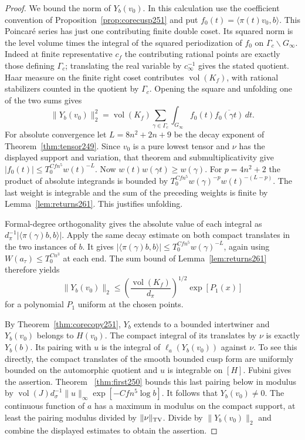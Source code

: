 \documentclass[a4paper,11pt]{article}
\theoremstyle{definition}
\theoremstyle{remark}
\numberwithin{equation}{section}
\begin{document}
\begin{proof}
We bound the norm of \(Y_b(v_0)\). In this calculation use
the coefficient convention of Proposition~\ref{prop:corecusp251}
and put \(f_0(t)=\langle\pi(t)v_0,b\rangle\). This Poincar\'e
series has just one contributing finite double coset. Its squared
norm is the level volume times the integral of the squared
periodization of \(f_0\) on \(\Gamma_c\backslash G_\infty\).
Indeed at finite representative \(c_f\) the contributing
rational points are exactly those defining \(\Gamma_c\);
translating the real variable by \(c_\infty^{-1}\) gives the
stated quotient. Haar measure on the finite right coset
contributes \(\operatorname{vol}(K_f)\), with rational
stabilizers counted in the quotient by \(\Gamma_c\).
Opening the square and unfolding one of the two sums gives
\[
 \|Y_b(v_0)\|_2^2=\operatorname{vol}(K_f)
   \sum_{\gamma\in\Gamma_c}\int_{G_\infty}
                f_0(t)\overline{f_0(\gamma t)}\,dt .
\]
For absolute convergence let \(L=8n^2+2n+9\) be the decay
exponent of Theorem~\ref{thm:tensor249}. Since \(v_0\) is a
pure lowest tensor and \(\nu\) has the displayed support and
variation, that theorem and submultiplicativity give
\(|f_0(t)|\le T_0^{C f n^5}w(t)^{-L}\).
Now \(w(t)w(\gamma t)\ge w(\gamma)\). For \(p=4n^2+2\) the
product of absolute integrands is bounded by
\(T_0^{C f n^5}w(\gamma)^{-p}w(t)^{-(L-p)}\).
The last weight is integrable and the sum of the preceding
weights is finite by Lemma~\ref{lem:returns261}. This
justifies unfolding.

Formal-degree orthogonality gives the absolute value of each
integral as \(d_\pi^{-1}|\langle\pi(\gamma)b,b\rangle|\).
Apply the same decay estimate on both compact translates in
the two instances of \(b\). It gives
\(|\langle\pi(\gamma)b,b\rangle|\le T_0^{C f n^5}w(\gamma)^{-L}\),
again using \(W(a_\tau)\le T_0^{C n^3}\) at each end. The sum
bound of Lemma~\ref{lem:returns261} therefore yields
\[
 \|Y_b(v_0)\|_2\le
 \left(\frac{\operatorname{vol}(K_f)}{d_\pi}\right)^{1/2}
                     \exp[P_1(x)]
\]
for a polynomial \(P_1\) uniform at the chosen points.

By Theorem~\ref{thm:corecopy251}, \(Y_b\) extends to a
bounded intertwiner and \(Y_b(v_0)\) belongs to \(H(v_0)\).
The compact integral of its translates by \(\nu\) is exactly
\(Y_b(b)\). Its pairing with \(u\) is the integral of
\(\ell_a(Y_b(v_0))\) against \(\nu\). To see this directly,
the compact translates of the smooth bounded cusp form are
uniformly bounded on the automorphic quotient and \(u\) is
integrable on \([H]\). Fubini gives the assertion. Theorem
~\ref{thm:first250} bounds this last pairing below in modulus by
\(\operatorname{vol}(J)d_\sigma^{-1}\|u\|_\infty
\exp[-Cfn^5\log b]\). It follows that \(Y_b(v_0)\ne0\).
The continuous function of \(a\) has a maximum in modulus
on the compact support, at least the pairing modulus divided
by \(\|\nu\|_{\rm TV}\). Divide by \(\|Y_b(v_0)\|_2\)
and combine the displayed estimates to obtain the assertion.
\end{proof}
\end{document}
